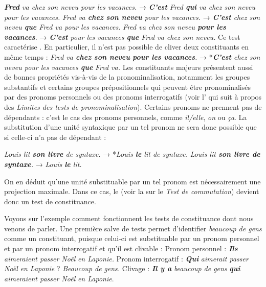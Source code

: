 \ea \ea\textit{\textbf{{Fred}}  {va chez son neveu pour les vacances.}}
→ \textit{\textbf{{C’est}}  {Fred} \textbf{{qui}}  {va chez son neveu pour les vacances.}}
\ex
\textit{{Fred va} \textbf{{chez son neveu}}  {pour les vacances.}}
→ \textit{\textbf{{C’est}} chez son neveu \textbf{{que}} Fred va pour les vacances.}
\ex
\textit{{Fred va chez son neveu} \textbf{{pour les vacances}}.}
→ \textit{\textbf{{C’est}}  {pour les vacances} \textbf{{que}}  {Fred va chez son neveu.}}
\z\z
Ce test caractérise . En particulier, il n’est pas possible de cliver deux constituants en même temps :
\ea
\textit{{Fred va} \textbf{{chez son neveu}} \textbf{{pour les vacances}}.}
→  *\textit{\textbf{{C’est}}  {chez son neveu pour les vacances} \textbf{{que}}} \textit{Fred va.}
\z
Les constituants majeurs présentent aussi de bonnes propriétés vis-à-vis de la pronominalisation, notamment les groupes substantifs et certains groupes prépositionnels qui peuvent être pronominalisés par des pronoms personnels ou des pronoms interrogatifs (voir l’ qui suit à propos des \textit{Limites des tests de pronominalisation}). Certains pronoms ne prennent pas de dépendants : c’est le cas des pronoms personnels, comme \textit{il/elle}, \textit{on} ou \textit{ça}. La substitution d’une unité syntaxique par un tel pronom ne sera donc possible que si celle-ci n’a pas de dépendant :

\ea\ea
    \textit{{Louis lit} \textbf{son livre}  {de syntaxe.}}    →  *\textit{Louis \textbf{{le}}  {lit de syntaxe.}}
\ex
    \textit{{Louis lit} \textbf{{son livre de syntaxe}}.}  →   \textit{{Louis} \textbf{{le}}  {lit.}}
\z\z

On en déduit qu’une unité substituable par un tel pronom est nécessairement une projection maximale. Dans ce cas, le  (voir la  sur le \textit{Test de commutation}) devient donc un test de constituance.

Voyons sur l'exemple  comment fonctionnent les tests de constituance dont nous venons de parler. Une première salve de tests permet d’identifier \textit{beaucoup de gens} comme un constituant, puisque celui-ci est substituable par un pronom personnel et par un pronom interrogatif et qu’il est clivable :
\ea
\ea Pronom personnel : \textbf{\textit{Ils}} \textit{aimeraient passer Noël} \textit{en Laponie.}
\ex Pronom interrogatif : \textbf{\textit{Qui}} \textit{aimerait passer Noël} \textit{en Laponie} ? \textit{Beaucoup de}                   \textit{gens.}
\ex Clivage : \textbf{\textit{Il y a}} \textit{beaucoup de gens} \textbf{\textit{qui}} \textit{aimeraient passer Noël} \textit{en Laponie}.
\z\z

